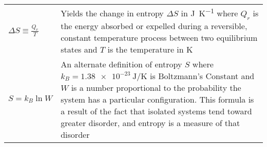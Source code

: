 \begin{longtable}{p{} p{}}
  \(\Delta S\equiv\displaystyle\frac{Q_r}{T}\) & Yields the change in entropy $\Delta S$ in \si{\joule\per\kelvin} where $Q_r$ is the energy absorbed or expelled during a reversible, constant temperature process between two equilibrium states and $T$ is the temperature in \si{\kelvin} \\
  \(S = k_B\ln W\) & An alternate definition of entropy $S$ where $k_B=\SI{1.38e-23}{\joule\per\kelvin}$ is Boltzmann's Constant and $W$ is a number proportional to the probability the system has a particular configuration. This formula is a result of the fact that isolated systems tend toward greater disorder, and entropy is a measure of that disorder \\
\end{longtable}
